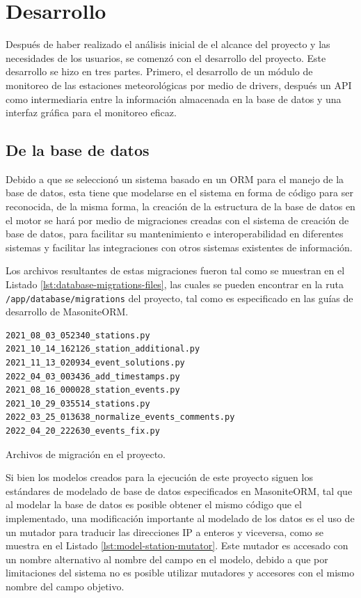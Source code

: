 
\section{Desarrollo}

Después de haber realizado el análisis inicial de el alcance del proyecto y las necesidades de los usuarios, se comenzó con el desarrollo del proyecto. Este desarrollo se hizo en tres partes. Primero, el desarrollo de un módulo de monitoreo de las estaciones meteorológicas por medio de drivers,  después un API como intermediaria entre la información almacenada en la base de datos y una interfaz gráfica para el monitoreo eficaz.

\subsection{De la base de datos}

Debido a que se seleccionó un sistema basado en un ORM para el manejo de la base de datos, esta tiene que modelarse en el sistema en forma de código para ser reconocida, de la misma forma, la creación de la estructura de la base de datos en el motor se hará por medio de migraciones creadas con el sistema de creación de base de datos, para facilitar su mantenimiento e interoperabilidad en diferentes sistemas y facilitar las integraciones con otros sistemas existentes de información.

Los archivos resultantes de estas migraciones fueron tal como se muestran en el Listado \ref{lst:database-migrations-files}, las cuales se pueden encontrar en la ruta \texttt{/app/database/migrations} del proyecto, tal como es especificado en las guías de desarrollo de MasoniteORM.

\begin{listing}
\begin{verbatim}
2021_08_03_052340_stations.py
2021_10_14_162126_station_additional.py
2021_11_13_020934_event_solutions.py
2022_04_03_003436_add_timestamps.py
2021_08_16_000028_station_events.py
2021_10_29_035514_stations.py
2022_03_25_013638_normalize_events_comments.py
2022_04_20_222630_events_fix.py
\end{verbatim}
\caption{Archivos de migración en el proyecto.}
\label{lst:database-migrations-files}
\end{listing}

Si bien los modelos creados para la ejecución de este proyecto siguen los estándares de modelado de base de datos especificados en MasoniteORM, tal que al modelar la base de datos es posible obtener el mismo código que el implementado, una modificación importante al modelado de los datos es el uso de un mutador para traducir las direcciones IP a enteros y viceversa, como se muestra en el Listado \ref{lst:model-station-mutator}. Este mutador es accesado con un nombre alternativo al nombre del campo en el modelo, debido a que por limitaciones del sistema no es posible utilizar mutadores y accesores con el mismo nombre del campo objetivo.

